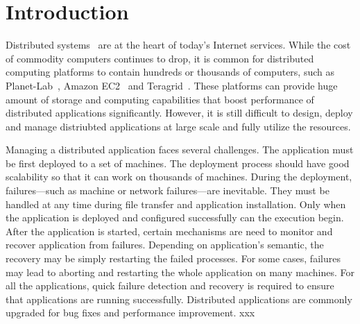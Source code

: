 \section{Introduction}


Distributed systems~\cite{Ghemawat2003, DeCandia2007} are at
the heart of today's Internet services. While the cost of
commodity computers continues to drop, it is common for
distributed computing platforms to contain hundreds or
thousands of computers, such as
Planet-Lab~\cite{Bavier2004}, Amazon
EC2~\cite{Garfinkel2007} and Teragrid~\cite{Catlett2002}.
These platforms can provide huge amount of storage and
computing capabilities that boost performance of distributed
applications significantly. However, it is still difficult
to design, deploy and manage distriubted applications at
large scale and fully utilize the resources.


Managing a distributed application faces several challenges.
The application must be first deployed to a set of machines.
The deployment process should have good scalability so that
it can work on thousands of machines. During the deployment,
failures---such as machine or network failures---are
inevitable. They must be handled at any time during file
transfer and application installation. Only when the application
is deployed and configured successfully can the execution
begin. After the application is started, certain mechanisms
are need to monitor and recover application from failures.
Depending on application's semantic, the recovery may be
simply restarting the failed processes. For some cases,
failures may lead to aborting and restarting the whole
application on many machines. For all the applications,
quick failure detection and recovery is required to ensure
that applications are running successfully. Distributed
applications are commonly upgraded for bug fixes and
performance improvement. xxx

